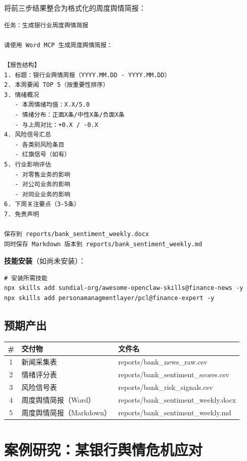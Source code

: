将前三步结果整合为格式化的周度舆情简报：

\begin{lstlisting}
任务：生成银行业周度舆情简报

请使用 Word MCP 生成周度舆情简报：

【报告结构】
1. 标题：银行业舆情周报（YYYY.MM.DD - YYYY.MM.DD）
2. 本周要闻 TOP 5（按重要性排序）
3. 情绪概况
   - 本周情绪均值：X.X/5.0
   - 情绪分布：正面X条/中性X条/负面X条
   - 与上周对比：+0.X / -0.X
4. 风险信号汇总
   - 各类别风险条目
   - 红旗信号（如有）
5. 行业影响评估
   - 对零售业务的影响
   - 对公司业务的影响
   - 对同业业务的影响
6. 下周关注要点（3-5条）
7. 免责声明

保存到 reports/bank_sentiment_weekly.docx
同时保存 Markdown 版本到 reports/bank_sentiment_weekly.md
\end{lstlisting}

\textbf{技能安装}（如尚未安装）：

\begin{lstlisting}[style=shell]
# 安装所需技能
npx skills add sundial-org/awesome-openclaw-skills@finance-news -y
npx skills add personamanagmentlayer/pcl@finance-expert -y
\end{lstlisting}

\subsection{预期产出}

\begin{table}[H]
\centering
\begin{tabular}{cll}
\toprule
\textbf{\#} & \textbf{交付物} & \textbf{文件名} \\
\midrule
1 & 新闻采集表 & reports/bank\_news\_raw.csv \\
2 & 情绪评分表 & reports/bank\_sentiment\_scores.csv \\
3 & 风险信号表 & reports/bank\_risk\_signals.csv \\
4 & 周度舆情简报（Word） & reports/bank\_sentiment\_weekly.docx \\
5 & 周度舆情简报（Markdown） & reports/bank\_sentiment\_weekly.md \\
\bottomrule
\end{tabular}
\end{table}

\section{案例研究：某银行舆情危机应对}

